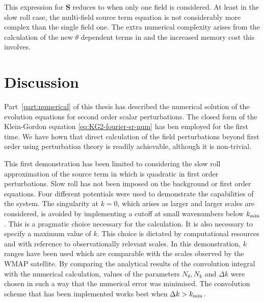 % 
This expression for $\bm{S}$ reduces to  when only one
field is considered. At least in the slow roll case, the multi-field source term
equation is not considerably more complex than the single field one. The extra
numerical complexity arises from the calculation of the new $\theta$
dependent terms in  and the increased memory cost this
involves. 




% 
% 
% 
\section{Discussion}
\label{sec:disc-num}

Part~\ref{part:numerical} of this thesis has described the numerical
solution of the evolution equations for second order scalar perturbations. The
closed form of the Klein-Gordon equation \eqref{eq:KG2-fourier-sr-num} has ben
employed for the first time. We have hown that direct
calculation of the field perturbations beyond
first order using perturbation theory is readily achievable, although
it is non-trivial.

This first demonstration has been limited to considering
the slow roll approximation of the source term in  which
is quadratic in first order perturbations. Slow roll has not been imposed on the
background or first order equations. Four different
potentials were
used to demonstrate the capabilities of the
system. The singularity at $k=0$, which arises as larger and larger
scales are considered, is avoided by implementing a cutoff at small
wavenumbers below $k_{\mathrm{min}}$. 
This is a pragmatic choice necessary for
the calculation.
It is also necessary to
specify a maximum value of $k$. This choice is dictated by computational
resources and with reference to observationally relevant scales. In
this demonstration, $k$ ranges have been used which are comparable with the
scales observed by the WMAP satellite. By comparing the analytical results of the
convolution integral with the numerical calculation, values of the parameters
$N_\theta, N_k$ and $\Delta k$ were chosen in such a way that the numerical error
was minimised. The convolution scheme that has been implemented
works best when $\Delta k>k_{\mathrm{min}}$.


